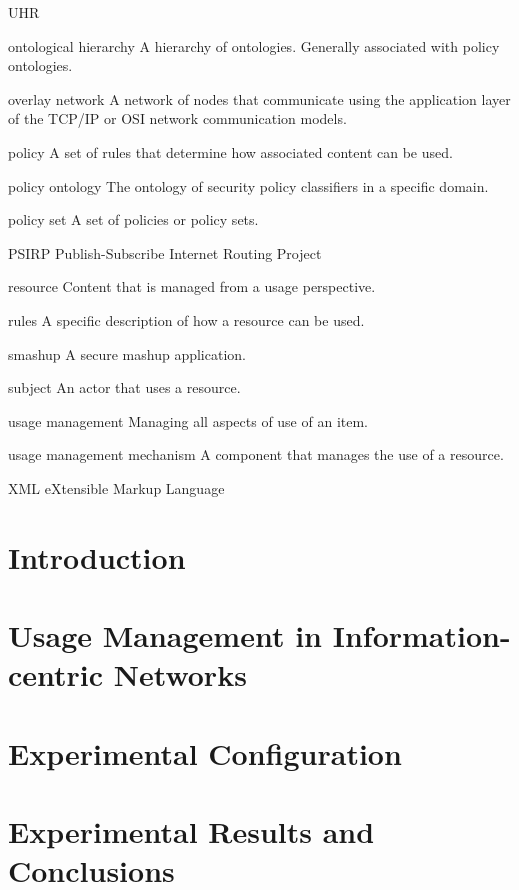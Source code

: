 \documentclass[botnum,fleqn,final]{unmeethesis}
\begin{document}
\begin{glossary}{UHR}
\item[ontological hierarchy] A hierarchy of ontologies.  Generally associated with policy ontologies.
\item[overlay network] A network of nodes that communicate using the application layer of the TCP/IP or OSI network communication models.
\item[policy] A set of rules that determine how associated content can be used.
\item[policy ontology] The ontology of security policy classifiers in a specific domain.
\item[policy set] A set of policies or policy sets.
\item[PSIRP] Publish-Subscribe Internet Routing Project
\item[resource] Content that is managed from a usage perspective.
\item[rules] A specific description of how a resource can be used.
\item[smashup] A secure mashup application.
\item[subject] An actor that uses a resource.
\item[usage management] Managing all aspects of use of an item.
\item[usage management mechanism] A component that manages the use of a resource.
\item[XML] eXtensible Markup Language
\end{glossary}

\mainmatter

\chapter{Introduction}








\chapter{Usage Management in Information-centric Networks}





\chapter{Experimental Configuration}
% 


\chapter{Experimental Results and Conclusions}



\pagebreak



\end{document}
